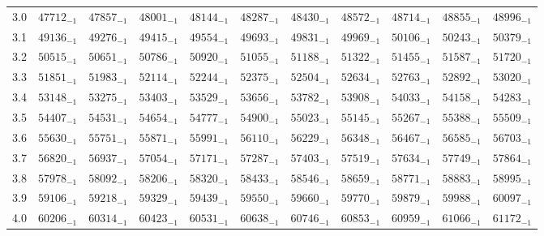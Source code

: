 \documentclass[10pt, a4paper]{article}
\begin{document}
\begin{center}
\begin{longtable}{c || c c c c c | c c c c c}
        \hline
        3.0 & \({47712}_{-1}\) & \({47857}_{-1}\) & \({48001}_{-1}\) & \({48144}_{-1}\) & \({48287}_{-1}\) & \({48430}_{-1}\) & \({48572}_{-1}\) & \({48714}_{-1}\) & \({48855}_{-1}\) & \({48996}_{-1}\)\\
        3.1 & \({49136}_{-1}\) & \({49276}_{-1}\) & \({49415}_{-1}\) & \({49554}_{-1}\) & \({49693}_{-1}\) & \({49831}_{-1}\) & \({49969}_{-1}\) & \({50106}_{-1}\) & \({50243}_{-1}\) & \({50379}_{-1}\)\\
        3.2 & \({50515}_{-1}\) & \({50651}_{-1}\) & \({50786}_{-1}\) & \({50920}_{-1}\) & \({51055}_{-1}\) & \({51188}_{-1}\) & \({51322}_{-1}\) & \({51455}_{-1}\) & \({51587}_{-1}\) & \({51720}_{-1}\)\\
        3.3 & \({51851}_{-1}\) & \({51983}_{-1}\) & \({52114}_{-1}\) & \({52244}_{-1}\) & \({52375}_{-1}\) & \({52504}_{-1}\) & \({52634}_{-1}\) & \({52763}_{-1}\) & \({52892}_{-1}\) & \({53020}_{-1}\)\\
        3.4 & \({53148}_{-1}\) & \({53275}_{-1}\) & \({53403}_{-1}\) & \({53529}_{-1}\) & \({53656}_{-1}\) & \({53782}_{-1}\) & \({53908}_{-1}\) & \({54033}_{-1}\) & \({54158}_{-1}\) & \({54283}_{-1}\)\\
        3.5 & \({54407}_{-1}\) & \({54531}_{-1}\) & \({54654}_{-1}\) & \({54777}_{-1}\) & \({54900}_{-1}\) & \({55023}_{-1}\) & \({55145}_{-1}\) & \({55267}_{-1}\) & \({55388}_{-1}\) & \({55509}_{-1}\)\\
        3.6 & \({55630}_{-1}\) & \({55751}_{-1}\) & \({55871}_{-1}\) & \({55991}_{-1}\) & \({56110}_{-1}\) & \({56229}_{-1}\) & \({56348}_{-1}\) & \({56467}_{-1}\) & \({56585}_{-1}\) & \({56703}_{-1}\)\\
        3.7 & \({56820}_{-1}\) & \({56937}_{-1}\) & \({57054}_{-1}\) & \({57171}_{-1}\) & \({57287}_{-1}\) & \({57403}_{-1}\) & \({57519}_{-1}\) & \({57634}_{-1}\) & \({57749}_{-1}\) & \({57864}_{-1}\)\\
        3.8 & \({57978}_{-1}\) & \({58092}_{-1}\) & \({58206}_{-1}\) & \({58320}_{-1}\) & \({58433}_{-1}\) & \({58546}_{-1}\) & \({58659}_{-1}\) & \({58771}_{-1}\) & \({58883}_{-1}\) & \({58995}_{-1}\)\\
        3.9 & \({59106}_{-1}\) & \({59218}_{-1}\) & \({59329}_{-1}\) & \({59439}_{-1}\) & \({59550}_{-1}\) & \({59660}_{-1}\) & \({59770}_{-1}\) & \({59879}_{-1}\) & \({59988}_{-1}\) & \({60097}_{-1}\)\\
        \hline
        4.0 & \({60206}_{-1}\) & \({60314}_{-1}\) & \({60423}_{-1}\) & \({60531}_{-1}\) & \({60638}_{-1}\) & \({60746}_{-1}\) & \({60853}_{-1}\) & \({60959}_{-1}\) & \({61066}_{-1}\) & \({61172}_{-1}\)\\

\end{longtable}
\end{center}
\end{document}
